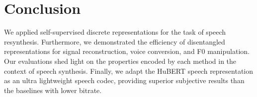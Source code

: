\vspace{-0.3cm}
\section{Conclusion}
\vspace{-0.1cm}
\label{sec:conc}

We applied self-supervised discrete representations for the task of speech resynthesis. Furthermore, we demonstrated the efficiency of disentangled representations for signal reconstruction, voice conversion, and F0 manipulation. Our evaluations shed light on the properties encoded by each method in the context of speech synthesis. Finally, we adapt the HuBERT speech representation as an ultra lightweight speech codec, providing superior subjective results than the baselines with lower bitrate.


